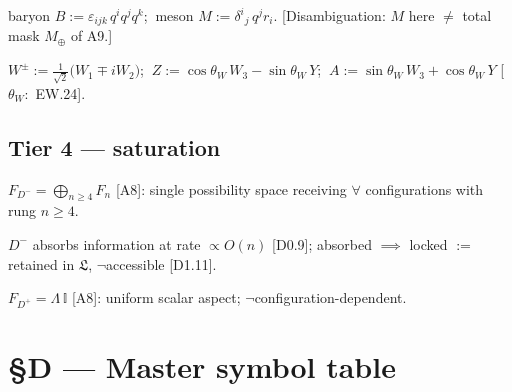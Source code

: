 \begin{definition}[{\texorpdfstring{D3.9}{D3.9}}]\label{tag:D3-9}
baryon $B:=\varepsilon_{ijk}\,q^iq^jq^k$; $\ $meson $M:=\delta^i{}_j\,q^jr_i$. [Disambiguation: $M$ here $\ne$ total mask $M_\oplus$ of A9.]

\end{definition}

\begin{definition}[{\texorpdfstring{D3.10}{D3.10}}]\label{tag:D3-10}
$W^\pm:=\tfrac1{\sqrt2}\bigl(W_1\mp iW_2\bigr)$; $\ Z:=\cos\theta_W\,W_3-\sin\theta_W\,Y$; $\ A:=\sin\theta_W\,W_3+\cos\theta_W\,Y$ [$\theta_W:$ EW.24].

\end{definition}

\subsection[Tier 4 — saturation]{\texorpdfstring{Tier 4 — saturation}{Tier 4 - saturation}}

\begin{definition}[{\texorpdfstring{D4.1}{D4.1}}]\label{tag:D4-1}
$F_{D^-}=\bigoplus_{n\ge4}F_n$ [A8]: single possibility space receiving $\forall$ configurations with rung $n\ge4$.

\end{definition}

\begin{definition}[{\texorpdfstring{D4.2}{D4.2}}]\label{tag:D4-2}
$D^-$ absorbs information at rate $\propto O(n)$ [D0.9]; absorbed $\implies$ locked $:=$ retained in $\mathfrak L$, $\neg$accessible [D1.11].

\end{definition}

\begin{definition}[{\texorpdfstring{D4.3}{D4.3}}]\label{tag:D4-3}
$F_{D^+}=\Lambda\,\mathbb I$ [A8]: uniform scalar aspect; $\neg$configuration-dependent.

\end{definition}

\section[§D — Master symbol table]{\texorpdfstring{§D — Master symbol table}{SD - Master symbol table}}

